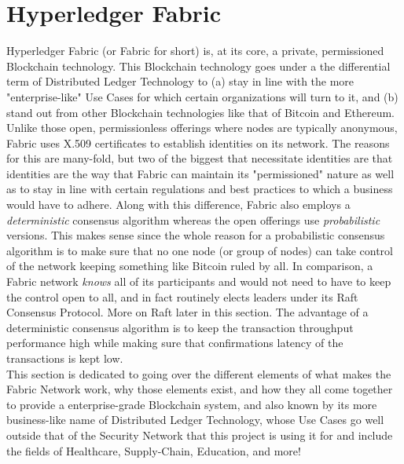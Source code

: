 \section{Hyperledger Fabric}
	\hspace{10mm}Hyperledger Fabric (or Fabric for short) is, at its core, a private, permissioned Blockchain technology. This Blockchain technology goes under a the differential term of Distributed Ledger Technology to (a) stay in line with the more "enterprise-like" Use Cases for which certain organizations will turn to it, and (b) stand out from other Blockchain technologies like that of Bitcoin and Ethereum. Unlike those open, permissionless offerings where nodes are typically anonymous, Fabric uses X.509 certificates to establish identities on its network. The reasons for this are many-fold, but two of the biggest that necessitate identities are that identities are the way that Fabric can maintain its "permissioned" nature as well as to stay in line with certain regulations and best practices to which a business would have to adhere. Along with this difference, Fabric also employs a \textit{deterministic} consensus algorithm whereas the open offerings use \textit{probabilistic} versions. This makes sense since the whole reason for a probabilistic consensus algorithm is to make sure that no one node (or group of nodes) can take control of the network keeping something like Bitcoin ruled by all. In comparison, a Fabric network \textit{knows} all of its participants and would not need to have to keep the control open to all, and in fact routinely elects leaders under its Raft Consensus Protocol. More on Raft later in this section. The advantage of a deterministic consensus algorithm is to keep the transaction throughput performance high while making sure that confirmations latency of the transactions is kept low.\\
	
	\hspace{10mm}This section is dedicated to going over the different elements of what makes the Fabric Network work, why those elements exist, and how they all come together to provide a enterprise-grade Blockchain system, and also known by its more business-like name of Distributed Ledger Technology, whose Use Cases go well outside that of the Security Network that this project is using it for and include the fields of Healthcare, Supply-Chain, Education, and more!\\
		

